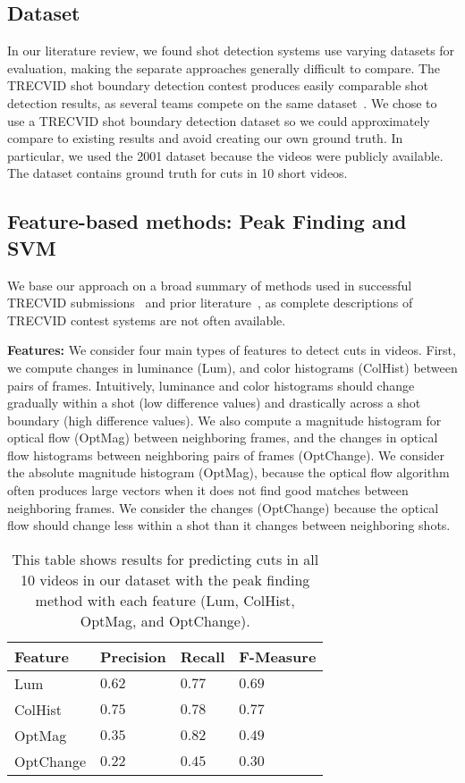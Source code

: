 \subsection*{Dataset}
In our literature review, we found shot detection systems use varying datasets for evaluation, making the separate approaches generally difficult to compare. The TRECVID shot boundary detection contest produces easily comparable shot detection results, as several teams compete on the same dataset~\cite{smeaton_video_2010}. We chose to use a TRECVID shot boundary detection dataset so we could approximately compare to existing results and avoid creating our own ground truth. In particular, we used the 2001 dataset because the videos were publicly available. The dataset contains ground truth for cuts in 10 short videos.

\subsection*{Feature-based methods: Peak Finding and SVM}
We base our approach on a broad summary of methods used in successful TRECVID submissions~\cite{smeaton_video_2010} and prior literature~\cite{boreczky1996comparison}, as complete descriptions of TRECVID contest systems are not often available. 

\textbf{Features:} We consider four main types of features to detect cuts in videos. First, we compute changes in luminance (Lum), and color histograms (ColHist) between pairs of frames. Intuitively, luminance and color histograms should change gradually within a shot (low difference values) and drastically across a shot boundary (high difference values). We also compute a magnitude histogram for optical flow (OptMag) between neighboring frames, and the changes in optical flow histograms between neighboring pairs of frames (OptChange). We consider the absolute magnitude histogram (OptMag), because the optical flow algorithm often produces large vectors when it does not find good matches between neighboring frames. We consider the changes (OptChange) because the optical flow should change less within a shot than it changes between neighboring shots.
\\

\begin{table}[h!]
  \begin{center}
  	\small{
	\begin{tabular}{l|lll}
	Feature   & Precision  & Recall     & F-Measure  \\ \hline
	Lum       & $0.62$ & $0.77$ & $0.69 $ \\
	ColHist   & $0.75$ & $0.78$ & $0.77$ \\
	OptMag    & $0.35$ & $0.82$ & $0.49$ \\
	OptChange & $0.22$ & $0.45$ & $0.30$ \\ \hline
	\end{tabular}
	}
  \end{center}
  \label{table:peakresults}
  \caption{This table shows results for predicting cuts in all 10 videos in our dataset with the peak finding method with each feature (Lum, ColHist, OptMag, and OptChange).}
\end{table} 

